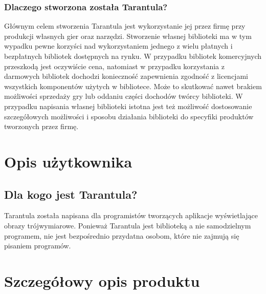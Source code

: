 \documentclass[11pt,leqno]{article}
\begin{document}
\subsubsection{Dlaczego stworzona została Tarantula?}
\noindent
Głównym celem stworzenia Tarantula jest wykorzystanie jej przez firmę przy produkcji własnych gier oraz narzędzi. 
Stworzenie własnej biblioteki ma w tym wypadku pewne korzyści nad wykorzystaniem jednego z wielu płatnych i bezpłatnych bibliotek 
dostępnych na rynku. W przypadku bibliotek komercyjnych przeszkodą jest oczywiście cena, natomiast w przypadku korzystania z darmowych 
bibliotek dochodzi konieczność zapewnienia zgodność z licencjami wszystkich komponentów użytych w bibliotece. Może to skutkować nawet 
brakiem możliwości sprzedaży gry lub oddaniu części dochodów twórcy biblioteki. W przypadku napisania własnej biblioteki istotna jest też możliwość dostosowanie szczegółowych 
możliwości i sposobu działania biblioteki do specyfiki produktów tworzonych przez firmę.

\section{Opis użytkownika}
\subsection{Dla kogo jest Tarantula?}
\noindent
Tarantula została napisana dla programistów tworzących aplikacje wyświetlające obrazy trójwymiarowe. Ponieważ Tarantula jest biblioteką a nie samodzielnym programem, 
nie jest bezpośrednio przydatna osobom, które nie zajmują się pisaniem programów.

\section{Szczegółowy opis produktu}
\end{document}
